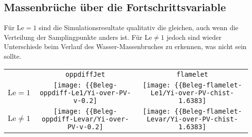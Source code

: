 \subsection{Massenbrüche über die Fortschrittsvariable}

Für $\mathrm{Le}=1$ sind die Simulationsresultate qualitativ die gleichen, auch wenn die Verteilung der Samplingpunkte anders ist. Für $\mathrm{Le}\neq 1$ jedoch sind wieder Unterschiede beim Verlauf des Wasser-Massenbruches zu erkennen, was nicht sein sollte.

\begin{minipage}{\linewidth}
    \captionsetup{type=table}
    \begin{tabular}{ccc}
        & \texttt{oppdiffJet} & \texttt{flamelet} \\
        $\mathrm{Le}=1$ &
        \texttt{[image: \{\{Beleg-oppdiff-Le1/Yi-over-PV-v-0.2]}}}   &
        \texttt{[image: \{\{Beleg-flamelet-Le1/Yi-over-PV-chist-1.6383]}}} \\
        $\mathrm{Le}\neq 1$ &
        \texttt{[image: \{\{Beleg-oppdiff-Levar/Yi-over-PV-v-0.2]}}}   &
        \texttt{[image: \{\{Beleg-flamelet-Levar/Yi-over-PV-chist-1.6383]}}}
    \end{tabular}
\end{minipage}

